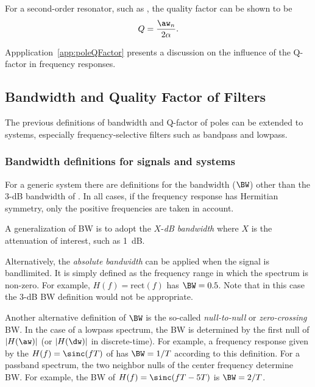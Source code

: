 For a second-order resonator, such as , the quality factor can be shown  to be
\begin{equation}
Q = \frac{\aw_n}{2 \alpha}.
\label{eq:q_factor_second_order}
\end{equation}

Appplication~\ref{app:poleQFactor} presents a discussion on the influence of the Q-factor in frequency responses.

\subsection{Bandwidth and Quality Factor of Filters}
\label{sec:bw_qfactor_filters}

The previous definitions of bandwidth and Q-factor of poles can be extended to systems, especially frequency-selective filters such as bandpass and lowpass.

\subsubsection{Bandwidth definitions for signals and systems}
\label{sec:bandwidthDefinitions}
For a generic system there are definitions for the bandwidth ($\BW$) other than the 3-dB bandwidth of . In all cases, if the frequency response has Hermitian symmetry, only the positive frequencies are taken in account.

A generalization of BW is to adopt the $X$-\emph{dB bandwidth} where $X$ is the attenuation of interest, such as 1~dB.

Alternatively, the \emph{absolute bandwidth} can be applied when the signal is bandlimited. It is simply defined as the frequency range in which the spectrum is non-zero. For example, $H(f)=\textrm{rect}(f)$ has $\BW=0.5$. Note that in this case the 3-dB BW definition would not be appropriate.

Another alternative definition of $\BW$ is the so-called \emph{null-to-null} or \emph{zero-crossing} BW. In the case of a lowpass spectrum, the BW is determined by the first null of $|H(\aw)|$ (or $|H(\dw)|$ in discrete-time). For example, a frequency response given by the $H(f)=\sinc(fT)$ of  has $\BW = 1/T$ according to this definition.
For a passband spectrum, the two neighbor nulls of the center frequency determine BW.
For example, the BW of $H(f)=\sinc(fT-5T)$ is $\BW = 2/T$.

